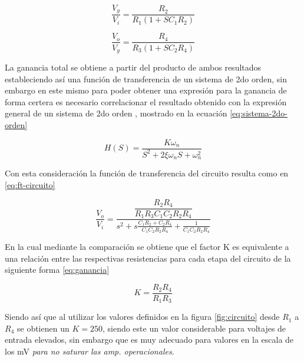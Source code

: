 \begin{equation}
	\frac{V_y}{V_i} = \frac{R_2}{R_1(1 + SC_1R_2)}
	\label{eq:ft-opam1}
\end{equation}

\begin{equation}
	\frac{V_o}{V_y} = \frac{R_4}{R_3(1 + SC_2R_4)}
	\label{eq:ft-opam2}
\end{equation}

La ganancia total se obtiene a partir del producto de ambos resultados estableciendo así una función de transferencia de un sistema de 2do orden, sin embargo en este mismo para poder obtener una expresión para la ganancia de forma certera es necesario correlacionar el resultado obtenido con la expresión general de un sistema de 2do orden \cite{ogata_ingenieria_control_moderna}, mostrado en la ecuación \ref{eq:sistema-2do-orden}

\begin{equation}
	H(S) = \frac{K\omega_n}{S^2 + 2\xi\omega_nS +  \omega^2_n} 
	\label{eq:sistema-2do-orden}
\end{equation}

Con esta consideración la función de transferencia del circuito resulta como en \ref{eq:ft-circuito}

\begin{equation}
	\frac{V_o}{V_i} = \frac{ \dfrac{R_2R_4}{R_1R_3C_1C_2R_2R_4} }{ s^2 +s\frac{C_1R_2 + C_2R_4}{C_1C_2R_2R_4} + \frac{1}{C_1C_2R_2R_4} }
	\label{eq:ft-circuito}
\end{equation}

En la cual mediante la comparación se obtiene que el factor K es equivalente a una relación entre las respectivas resistencias para cada etapa del circuito de la siguiente forma \ref{eq:ganancia}

\begin{equation}
	K = \frac{R_2R_4}{R_1R_3}
	\label{eq:ganancia}
\end{equation}

Siendo así que al utilizar los valores definidos en la figura \ref{fig:circuito} desde $R_1$ a $R_4$ se obtienen un $K = 250$, siendo este un valor considerable para voltajes de entrada elevados, sin embargo que es muy adecuado para valores en la escala de los mV \textit{para no saturar las amp. operacionales}.

















